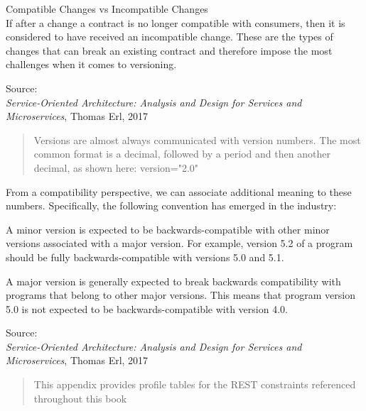 \documentclass[Screen16to9,17pt]{foils}
\begin{document}

\begin{list2}
\item Compatible Changes vs Incompatible Changes\\
If after a change a contract is no longer compatible with consumers, then it is considered to have received an incompatible change. These are the types of changes that can break an existing contract and therefore impose the most challenges when it comes to versioning.
\end{list2}

Source: {\footnotesize\\
\emph{Service‑Oriented Architecture: Analysis and Design for Services and Microservices}, Thomas Erl, 2017}




\begin{quote}
Versions are almost always communicated with version numbers. The most common
format is a decimal, followed by a period and then another decimal, as shown here: version="2.0"
\end{quote}

From a compatibility perspective, we can associate additional meaning to these numbers. Specifically, the following convention has emerged in the industry:
\begin{list2}
\item A minor version is expected to be backwards-compatible with other minor versions associated with a major version. For example, version 5.2 of a program should be fully backwards-compatible with versions 5.0 and 5.1.
\item A major version is generally expected to break backwards compatibility with programs that belong to other major versions. This means that program version 5.0 is not expected to be backwards-compatible with version 4.0.
\end{list2}

Source: {\footnotesize\\
\emph{Service‑Oriented Architecture: Analysis and Design for Services and Microservices}, Thomas Erl, 2017}




\begin{quote}
This appendix provides profile tables for the REST constraints referenced throughout this book
\end{quote}
\end{document}

